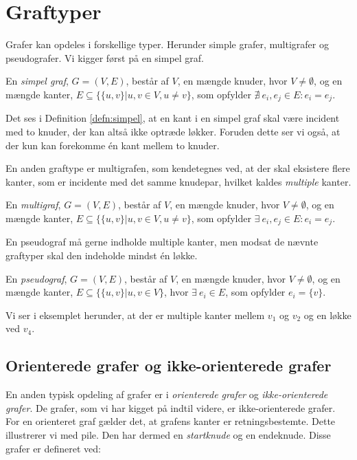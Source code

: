 \section{Graftyper}
Grafer kan opdeles i forskellige typer. Herunder simple grafer, multigrafer og pseudografer. Vi kigger først på en simpel graf.

\begin{defn} \label{defn:simpel}
En \emph{simpel graf}, $G=(V,E)$, består af $V$, en mængde knuder, hvor $V \neq \emptyset$, og en mængde kanter, $E \subseteq \{\{u,v\}|u,v \in V, u \neq v\}$, som opfylder $\nexists \ e_i, e_j \in E : e_i = e_j$.
\end{defn}

Det ses i Definition \ref{defn:simpel}, at en kant i en simpel graf skal være incident med to knuder, der kan altså ikke optræde løkker. Foruden dette ser vi også, at der kun kan forekomme én kant mellem to knuder.



En anden graftype er multigrafen, som kendetegnes ved, at der skal eksistere flere kanter, som er incidente med det samme knudepar, hvilket kaldes \emph{multiple} kanter.

\begin{defn}[Multigraf] \label{defn:multi}
En \emph{multigraf}, $ G = (V,E)$, består af $V$, en mængde knuder, hvor $V \neq \emptyset$, og en mængde kanter,
$E \subseteq \{\{u,v\}|u,v \in V, u \neq v\}$, som opfylder $\exists \ e_i, e_j \in E : e_i = e_j$.
\end{defn}



En pseudograf må gerne indholde multiple kanter, men modsat de nævnte graftyper skal den indeholde mindst én løkke. 

\begin{defn}[Pseudograf] \label{defn:pseudo}
En \emph{pseudograf}, $ G = (V,E)$, består af $V$, en mængde knuder, hvor $V \neq \emptyset$, og en mængde kanter, $E \subseteq \{\{u,v\}|u,v \in V\}$, hvor $\exists \ e_i \in E$, som opfylder $e_i = \{v\}$.
\end{defn}

Vi ser i eksemplet herunder, at der er multiple kanter mellem $v_{1}$ og $v_{2}$ og en løkke ved $v_{4}$.




\subsection{Orienterede grafer og ikke-orienterede grafer}
En anden typisk opdeling af grafer er i \emph{orienterede grafer} og \emph{ikke-orienterede grafer}. De grafer, som vi har kigget på indtil videre, er ikke-orienterede grafer. For en orienteret graf gælder det, at grafens kanter er retningsbestemte. Dette illustrerer vi med pile. Den har dermed en \emph{startknude} og en endeknude. Disse grafer er defineret ved:

